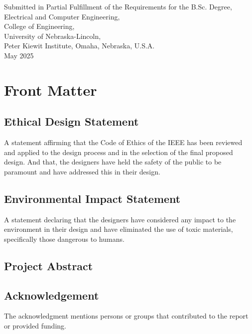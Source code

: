 \documentclass[12pt]{article}
\begin{document}
\begin{titlepage}
\begin{center}
        \vspace{3cm}
        
        \small Submitted in Partial Fulfillment of the Requirements for the B.Sc. Degree,\\
        \small Electrical and Computer Engineering,\\
        \small College of Engineering,\\
        \small University of Nebraska-Lincoln,\\
        \small Peter Kiewit Institute, Omaha, Nebraska, U.S.A.\\
        \small May 2025\\
    \end{center}
    \thispagestyle{empty}
\end{titlepage}

\newpage

\section*{Front Matter}

\subsection*{Ethical Design Statement}
A statement affirming that the Code of Ethics of the IEEE has been reviewed and applied to the design process and in the selection of the final proposed design. And that, the designers have held the safety of the public to be paramount and have addressed this in their design.

\subsection*{Environmental Impact Statement}
A statement declaring that the designers have considered any impact to the environment in their design and have eliminated the use of toxic materials, specifically those dangerous to humans.

\subsection*{Project Abstract}

\subsection*{Acknowledgement}
The acknowledgment mentions persons or groups that contributed to the report or provided funding.
\end{document}
